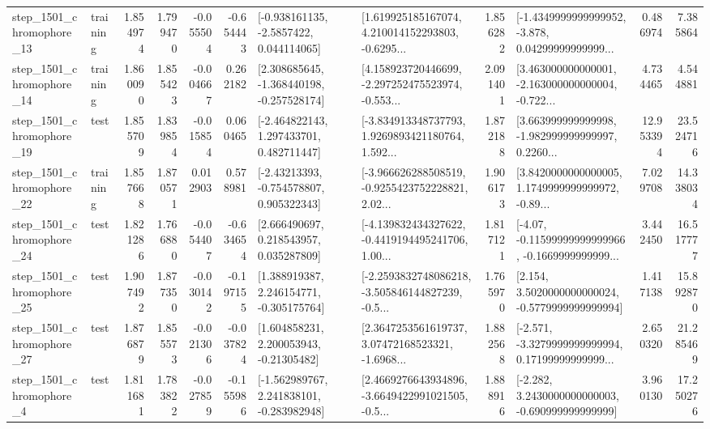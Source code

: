 \begin{tabular}{llrrrrllrlrr}
 step\_1501\_chromophore\_13 &  training &      1.854974 &    1.799470 &     -0.055504 & -0.654443 &     [-0.938161135, -2.5857422, 0.044114065] &  [1.619925185167074, 4.210014152293803, -0.6295... &       1.856282 &  [-1.4349999999999952, -3.878, 0.04299999999999... &            0.486974 &          7.385864 \\
 step\_1501\_chromophore\_14 &  training &      1.860090 &    1.855423 &     -0.004667 &  0.262182 &   [2.308685645, -1.368440198, -0.257528174] &  [4.158923720446699, -2.297252475523974, -0.553... &       2.091401 &  [3.463000000000001, -2.163000000000004, -0.722... &            4.734465 &          4.544881 \\
 step\_1501\_chromophore\_19 &      test &      1.855709 &    1.839854 &     -0.015854 &  0.060465 &    [-2.464822143, 1.297433701, 0.482711447] &  [-3.834913348737793, 1.9269893421180764, 1.592... &       1.872188 &  [3.663999999999998, -1.982999999999997, 0.2260... &           12.953394 &         23.524716 \\
 step\_1501\_chromophore\_22 &  training &      1.857668 &    1.870571 &      0.012903 &  0.578981 &    [-2.43213393, -0.754578807, 0.905322343] &  [-3.966626288508519, -0.9255423752228821, 2.02... &       1.906173 &  [3.8420000000000005, 1.1749999999999972, -0.89... &            7.029708 &         14.338034 \\
 step\_1501\_chromophore\_24 &      test &      1.821286 &    1.766880 &     -0.054407 & -0.634654 &     [2.666490697, 0.218543957, 0.035287809] &  [-4.139832434327622, -0.4419194495241706, 1.00... &       1.817121 &  [-4.07, -0.11599999999999966, -0.1669999999999... &            3.442450 &         16.517777 \\
 step\_1501\_chromophore\_25 &      test &      1.907492 &    1.877350 &     -0.030142 & -0.197155 &    [1.388919387, 2.246154771, -0.305175764] &  [-2.2593832748086218, -3.505846144827239, -0.5... &       1.765970 &   [2.154, 3.5020000000000024, -0.5779999999999994] &            1.417138 &         15.892870 \\
 step\_1501\_chromophore\_27 &      test &      1.876879 &    1.855573 &     -0.021306 & -0.037824 &     [1.604858231, 2.200053943, -0.21305482] &  [2.3647253561619737, 3.07472168523321, -1.6968... &       1.882568 &  [-2.571, -3.3279999999999994, 0.17199999999999... &            2.650320 &         21.285469 \\
  step\_1501\_chromophore\_4 &      test &      1.811681 &    1.783822 &     -0.027859 & -0.155986 &   [-1.562989767, 2.241838101, -0.283982948] &  [2.4669276643934896, -3.6649422991021505, -0.5... &       1.888916 &   [-2.282, 3.2430000000000003, -0.690999999999999] &            3.960130 &         17.250276 \\

\end{tabular}
